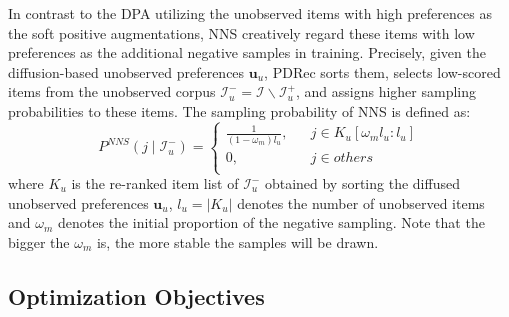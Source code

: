 \documentclass[letterpaper]{article} %
\begin{document}
In contrast to the DPA utilizing the unobserved items with high preferences as the soft positive augmentations, NNS creatively regard these items with low preferences as the additional negative samples in training. Precisely, given the diffusion-based unobserved preferences $\bm{u}_{u}$, PDRec sorts them, selects low-scored items from the unobserved corpus $\mathcal{I}^{-}_u=\mathcal{I}\backslash\mathcal{I}^{+}_u$, and assigns higher sampling probabilities to these items. The sampling probability of NNS is defined as:
\begin{equation}
 P^{N\!N\!S}(j\!\mid\!\mathcal{I}^{-}_u)\!=\!\left\{
    \begin{array}{rcl}
        \frac{1}{(1-\omega_m)l_u}, \!&&\! j \in K_u[\omega_m l_u:l_u]\\
        0,           \!&&\! j \in others\\
    \end{array} \right. 
\end{equation}
where $K_u$ is the re-ranked item list of $\mathcal{I}^{-}_u$ obtained by sorting the diffused unobserved preferences $\bm{u}_{u}$, $l_u\!=\!|K_u|$ denotes the number of unobserved items and $\omega_m$ denotes the initial proportion of the negative sampling. Note that the bigger the $\omega_m$ is, the more stable the samples will be drawn.

\subsection{Optimization Objectives}
\label{sec.opt}
\end{document}
